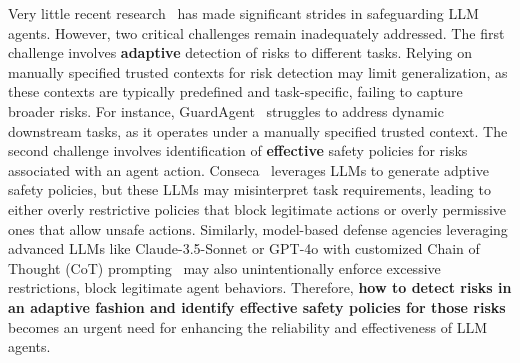 Very little recent research~\cite{xiang2024guardagentsafeguardllmagents, tsai2025contextkeyagentsecurity, ruan2024toolemu, hua2024trustagentsafetrustworthyllmbased} has made significant strides in safeguarding LLM agents. However, two critical challenges remain inadequately addressed. The first challenge involves \textbf{adaptive} detection of risks to different tasks. Relying on manually specified trusted contexts for risk detection may limit generalization, as these contexts are typically predefined and task-specific, failing to capture broader risks. For instance, GuardAgent~\cite{xiang2024guardagentsafeguardllmagents} struggles to address dynamic downstream tasks, as it operates under a manually specified trusted context.  The second challenge involves identification of \textbf{effective} safety policies for risks associated with an agent action. Conseca~\cite{tsai2025contextkeyagentsecurity} leverages LLMs to generate adptive safety policies, but these LLMs may misinterpret task requirements, leading to either overly restrictive policies that block legitimate actions or overly permissive ones that allow unsafe actions. Similarly, model-based defense agencies leveraging advanced LLMs like Claude-3.5-Sonnet or GPT-4o with customized Chain of Thought (CoT) prompting~\cite{wei2023chainofthoughtpromptingelicitsreasoning} may also unintentionally enforce excessive restrictions, block legitimate agent behaviors. Therefore, \textbf{how to detect risks in an adaptive fashion and identify effective safety policies for those risks} becomes an urgent need for enhancing the reliability and effectiveness of LLM agents.
